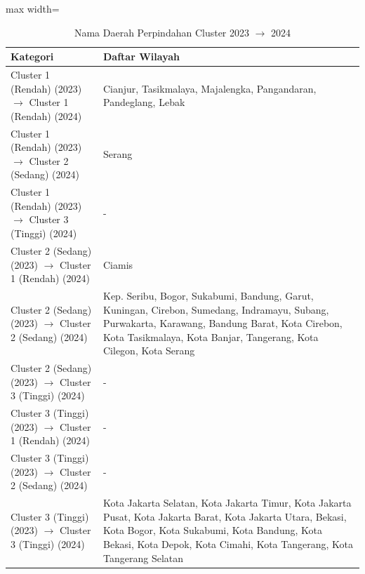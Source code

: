 \begin{table}[H]
\centering
\caption{Nama Daerah Perpindahan Cluster 2023 \(\rightarrow\) 2024} \label{tab:apptransname2023x2024}
\begin{adjustbox}{max width=\textwidth}
\begin{tabular}{|p{4cm}|p{10cm}|}
\hline
\textbf{Kategori} & \textbf{Daftar Wilayah} \\
\hline
Cluster 1 (Rendah) (2023) \(\rightarrow\) Cluster 1 (Rendah) (2024) & Cianjur, Tasikmalaya, Majalengka, Pangandaran, Pandeglang, Lebak \\
\hline
Cluster 1 (Rendah) (2023) \(\rightarrow\) Cluster 2 (Sedang) (2024) & Serang \\
\hline
Cluster 1 (Rendah) (2023) \(\rightarrow\) Cluster 3 (Tinggi) (2024) & - \\
\hline
Cluster 2 (Sedang) (2023) \(\rightarrow\) Cluster 1 (Rendah) (2024) & Ciamis \\
\hline
Cluster 2 (Sedang) (2023) \(\rightarrow\) Cluster 2 (Sedang) (2024) & Kep. Seribu, Bogor, Sukabumi, Bandung, Garut, Kuningan, Cirebon, Sumedang, Indramayu, Subang, Purwakarta, Karawang, Bandung Barat, Kota Cirebon, Kota Tasikmalaya, Kota Banjar, Tangerang, Kota Cilegon, Kota Serang \\
\hline
Cluster 2 (Sedang) (2023) \(\rightarrow\) Cluster 3 (Tinggi) (2024) & - \\
\hline
Cluster 3 (Tinggi) (2023) \(\rightarrow\) Cluster 1 (Rendah) (2024) & - \\
\hline
Cluster 3 (Tinggi) (2023) \(\rightarrow\) Cluster 2 (Sedang) (2024) & - \\
\hline
Cluster 3 (Tinggi) (2023) \(\rightarrow\) Cluster 3 (Tinggi) (2024) & Kota Jakarta Selatan, Kota Jakarta Timur, Kota Jakarta Pusat, Kota Jakarta Barat, Kota Jakarta Utara, Bekasi, Kota Bogor, Kota Sukabumi, Kota Bandung, Kota Bekasi, Kota Depok, Kota Cimahi, Kota Tangerang, Kota Tangerang Selatan \\
\hline
\end{tabular}
\end{adjustbox}
\end{table}